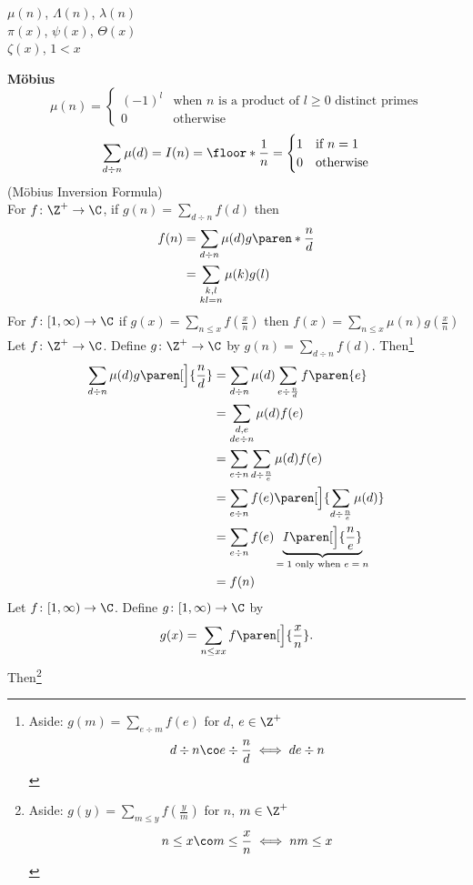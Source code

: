 $\mu(n)$, $\Lambda(n)$, $\lambda(n)$ \\
$\pi(x)$, $\psi(x)$, $\Theta(x)$ \\
$\zeta(x)$, $1<x$

\textbf{M\"obius}
\[ \mu(n) = \begin{cases}
(-1)^l & \text{when $n$ is a product of $l\geq0$ distinct primes} \\
0 & \text{otherwise}
\end{cases} \]
\thm
\[ \sum_{d\div n}\mu(d) = I(n) = \floor*{\frac{1}{n}} = \begin{cases}
1 & \text{if $n=1$} \\
0 & \text{otherwise}
\end{cases} \]
\thm (M\"obius Inversion Formula) \\
For $f\colon\Z^+\to\C$, if $g(n)=\sum_{d\div n}f(d)$ then
\begin{align*}
f(n) &= \sum_{d\div n}\mu(d)g\paren*{\frac{n}{d}} \\
&= \sum_{\substack{k,l\\kl=n}}\mu(k)g(l)
\end{align*}
For $f\colon[1,\infty)\to\C$ if $g(x)=\sum_{n\leq x}f(\frac{x}{n})$ then $f(x)=\sum_{n\leq x}\mu(n)g(\frac{x}{n})$ \\
\pf Let $f\colon\Z^+\to\C$.  Define $g\colon\Z^+\to\C$ by $g(n)=\sum_{d\div n}f(d)$.  Then\footnote{Aside: $g(m)=\sum_{e\div m}f(e)$ for $d$, $e\in\Z^+$
\[ d\div n\co e\div\frac nd \iff de\div n \]
}
\begin{align*}
\sum_{d\div n}\mu(d)g\paren[\Big]{\frac{n}{d}} &= \sum_{d\div n}\mu(d)\sum_{e\div\frac nd}f\paren{e} \\
&= \sum_{\substack{d,e\\de\div n}}\mu(d)f(e) \\
&= \sum_{e\div n}\sum_{d\div\frac ne}\mu(d)f(e) \\
&= \sum_{e\div n}f(e)\paren[\Big]{\sum_{d\div\frac ne}\mu(d)} \\
&= \sum_{e\div n}f(e)\underbrace{I\paren[\Big]{\frac ne}}_{\text{$=1$ only when $e=n$}} \\
&= f(n)
\end{align*}
Let $f\colon[1,\infty)\to\C$.  Define $g\colon[1,\infty)\to\C$ by
\[ g(x) = \sum_{n\leq xx}f\paren[\Big]{\frac xn} . \]
Then\footnote{Aside: $g(y)=\sum_{m\leq y}f(\frac ym)$ for $n$, $m\in\Z^+$
\[ n\leq x\co m\leq\frac xn\iff nm\leq x \]}
